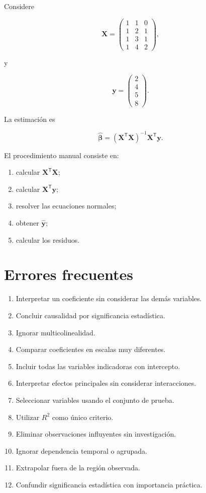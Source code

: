 \documentclass[
  spanish,
  11pt,
  letterpaper,
  DIV=11,
  numbers=noendperiod]{scrreprt}
\providecommand{\tightlist}{%
  \setlength{\itemsep}{0pt}\setlength{\parskip}{0pt}}
\theoremstyle{definition}
\theoremstyle{plain}
\theoremstyle{definition}
\theoremstyle{remark}
\begin{document}
Considere

\[
\mathbf{X}
=
\begin{pmatrix}
1 & 1 & 0\\
1 & 2 & 1\\
1 & 3 & 1\\
1 & 4 & 2
\end{pmatrix},
\]

y

\[
\mathbf{y}
=
\begin{pmatrix}
2\\
4\\
5\\
8
\end{pmatrix}.
\]

La estimación es

\[
\widehat{\boldsymbol{\beta}}
=
\left(
\mathbf{X}^{\mathsf T}\mathbf{X}
\right)^{-1}
\mathbf{X}^{\mathsf T}\mathbf{y}.
\]

El procedimiento manual consiste en:

\begin{enumerate}
\def\labelenumi{\arabic{enumi}.}
\tightlist
\item
  calcular \(\mathbf{X}^{\mathsf T}\mathbf{X}\);
\item
  calcular \(\mathbf{X}^{\mathsf T}\mathbf{y}\);
\item
  resolver las ecuaciones normales;
\item
  obtener \(\widehat{\mathbf{y}}\);
\item
  calcular los residuos.
\end{enumerate}

\section{Errores frecuentes}\label{errores-frecuentes-9}

\begin{enumerate}
\def\labelenumi{\arabic{enumi}.}
\tightlist
\item
  Interpretar un coeficiente sin considerar las demás variables.
\item
  Concluir causalidad por significancia estadística.
\item
  Ignorar multicolinealidad.
\item
  Comparar coeficientes en escalas muy diferentes.
\item
  Incluir todas las variables indicadoras con intercepto.
\item
  Interpretar efectos principales sin considerar interacciones.
\item
  Seleccionar variables usando el conjunto de prueba.
\item
  Utilizar \(R^2\) como único criterio.
\item
  Eliminar observaciones influyentes sin investigación.
\item
  Ignorar dependencia temporal o agrupada.
\item
  Extrapolar fuera de la región observada.
\item
  Confundir significancia estadística con importancia práctica.
\end{enumerate}
\end{document}
